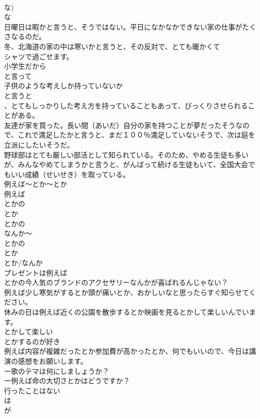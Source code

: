 \documentclass[8pt]{extreport}
\begin{document}
\begin{CJK}{UTF8}{min}
\\	な) 
\\	な 
\\	日曜日は暇かと言うと、そうではない。平日になかなかできない家の仕事がたくさなるのだ。
\\	冬、北海道の家の中は寒いかと言うと、その反対で、とても暖かくて
\\	シャツで過ごせます。
\\	小学生だから
\\	と言って
\\	子供のような考えしか持っていないか
\\	と言うと
\\	、とてもしっかりした考え方を持っていることもあって、びっくりさせられることがある。
\\	友達が家を買った。長い間（あいだ）自分の家を持つことが夢だったそうなので、これで満足したかと言うと、まだ１００％満足していないそうで、次は庭を立派にしたいそうだ。
\\	野球部はとても厳しい部活として知られている。そのため、やめる生徒も多いが、みんなやめてしまうかと言うと、がんばって続ける生徒もいて、全国大会でもいい成績（せいせき）を取っている。
\\	例えば～とか～とか
\\	例えば 
\\	とかの
\\	とか 
\\	とかの
\\	なんか～ 
\\	とかの
\\	とか 
\\	とか/なんか 
\\	プレゼントは例えば
\\	とかの今人気のブランドのアクセサリーなんかが喜ばれるんじゃない？
\\	例えば少し寒気がするとか頭が痛いとか、おかしいなと思ったらすぐ知らせてください。
\\	休みの日は例えば近くの公園を散歩するとか映画を見るとかして楽しいんでいます。
\\	とかして楽しい
\\	とかするのが好き
\\	例えば内容が複雑だったとか参加費が高かったとか、何でもいいので、今日は講演の感想をお願いします。
\\	ー歌のテマは何にしましょうか？
\\	ー例えば命の大切さとかはどうですか？	
\\	行ったことはない
\\	は 
\\	が 

\end{CJK}
\end{document}
